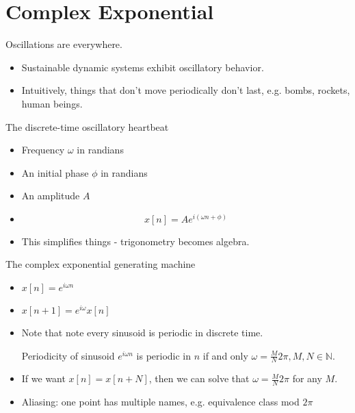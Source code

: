 \documentclass[../main.tex]{subfiles}
\begin{document}
\section{Complex Exponential}
\begin{remark}
    Oscillations are everywhere.
    \begin{itemize}
        \item Sustainable dynamic systems exhibit oscillatory behavior.
        \item Intuitively, things that don't move periodically don't last, e.g. bombs, rockets, human beings.
    \end{itemize}
\end{remark}
\begin{pbox}{The discrete-time oscillatory heartbeat}
\begin{itemize}
    \item Frequency $\omega$ in randians
    \item An initial phase $\phi$ in randians
    \item An amplitude $A$
    \item \[
    x[n] = A e^{i(\omega n+\phi)}
    \]
    \item This simplifies things - trigonometry becomes algebra.
\end{itemize}
\end{pbox}
\begin{pbox}{The complex exponential generating machine}
\begin{itemize}
    \item $x[n]=e^{i\omega n}$
    \item $x[n+1]=e^{i\omega}x[n]$
    \item Note that note every sinusoid is periodic in discrete time.

\begin{bbox}{Periodicity of sinusoid}
    $e^{i\omega n}$ is periodic in $n$ if and only $\omega = \frac{M}{N}2\pi,M,N\in \mathbb{N}$.
\end{bbox}
    \item If we want $x[n]=x[n+N]$, then we can solve that $\omega = \frac{M}{N}2\pi$ for any $M$.
     \item Aliasing: one point has multiple names, e.g. equivalence class mod $2\pi$
    \end{itemize}
   
\end{pbox}
\end{document}
